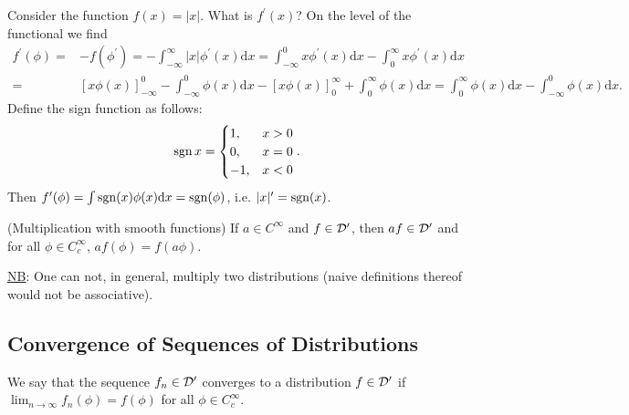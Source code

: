 \documentclass[11pt]{article}
\begin{document}
			\begin{eg}
				Consider the function $f(x)=|x|$. What is $f^\prime(x)$? On the level of the functional we find
				\begin{align*}
					f^\prime(\phi)=&-f(\phi^\prime)=-\int_{-\infty}^\infty|x|\phi^\prime(x)\mathrm{d}x=\int_{-\infty}^0x\phi^\prime(x)\mathrm{d}x-\int_0^\infty x\phi^\prime(x)\mathrm{d}x\\=&[x\phi(x)]_{-\infty}^0-\int_{-\infty}^0\phi(x)\mathrm{d}x-[x\phi(x)]_0^\infty+\int_0^\infty\phi(x)\mathrm{d}x=\int_0^\infty\phi(x)\mathrm{d}x-\int_{-\infty}^0\phi(x)\mathrm{d}x.
				\end{align*}
				Define the sign function as follows:
				\begin{equation*}
					\operatorname{sgn} x=\begin{cases}
						1, & x>0\\
						0, & x=0\\
						-1, & x<0
					\end{cases}.
				\end{equation*}
				Then $f^\prime(\phi)=\int\operatorname{sgn}(x)\phi(x)\mathrm{d}x=\operatorname{sgn}(\phi)$, i.e. $|x|^\prime=\operatorname{sgn}(x)$.
			\end{eg}

			\begin{defi}
				(Multiplication with smooth functions) If $a\in C^\infty$ and $f\in\mathcal{D}^\prime$, then $af\in\mathcal{D}^\prime$ and for all $\phi\in C^\infty_c$, $af(\phi)=f(a\phi)$.
			\end{defi}

			\noindent\underline{NB}: One can not, in general, multiply two distributions (naive definitions thereof would not be associative).


		\subsection{Convergence of Sequences of Distributions}

			\begin{defi}
				We say that the sequence $f_n\in\mathcal{D}^\prime$ converges to a distribution $f\in\mathcal{D}^\prime$ if $\lim_{n\to\infty}f_n(\phi)=f(\phi)$ for all $\phi\in C^\infty_c$.
			\end{defi}
\end{document}

